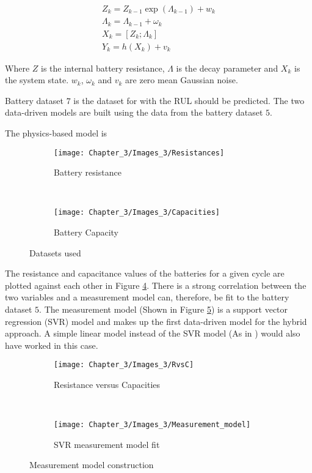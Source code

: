 \begin{equation}
\begin{array}{l}{Z_{k}=Z_{k-1} \exp \left(\Lambda_{k-1}\right)+w_{k}} \\ {\Lambda_{k}=\Lambda_{k-1}+\omega_{k}} \\ {X_{k}=\left[Z_{k} ; \Lambda_{k}\right]} \\ {Y_{k}=h\left(X_{k}\right)+v_{k}}\end{array}
\label{eq:decay}
\end{equation}

Where $Z$ is the internal battery resistance, $\Lambda$ is the decay parameter and $X_{k}$ is the system state. $w_{k}$, $\omega_{k}$  and $ v_{k}$ are zero mean Gaussian noise. 

Battery dataset $7$ is the dataset for with the RUL should be predicted.  The two data-driven models are built using the data from the battery dataset $5$. 

The physics-based model is 

\begin{figure}[H]
	\centering
	\begin{subfigure}{0.49\textwidth}
		\texttt{[image: Chapter\_3/Images\_3/Resistances]}
		\caption{Battery resistance}
		\label{F:Resistance}
	\end{subfigure}
	~
	\begin{subfigure}{0.49\textwidth}
		\texttt{[image: Chapter\_3/Images\_3/Capacities]}
		\caption{Battery Capacity}
		\label{F:Capacities}
	\end{subfigure}
	
	\caption{Datasets used}
	\label{F:Dataset}
\end{figure}

The resistance and capacitance values of the batteries for a given cycle are plotted against each other in Figure \ref{F:RvC}. There is a strong correlation between the two variables and a measurement model can, therefore, be fit to the battery dataset $5$. The measurement model (Shown in Figure \ref{F:SVR}) is a support vector regression (SVR) model and makes up the first data-driven model for the hybrid approach. A simple linear model instead of the SVR model (As in \cite{Liao2016}) would also have worked in this case.  

\begin{figure}[H]
	\centering
	\begin{subfigure}{0.49\textwidth}
		\texttt{[image: Chapter\_3/Images\_3/RvsC]}
		\caption{Resistance versus Capacities}
		\label{F:RvC}
	\end{subfigure}
	~
	\begin{subfigure}{0.49\textwidth}
		\texttt{[image: Chapter\_3/Images\_3/Measurement\_model]}
		\caption{SVR measurement model fit}
		\label{F:SVR}
	\end{subfigure}
	
	\caption{Measurement model construction}
	\label{F:Measurement}
\end{figure}


